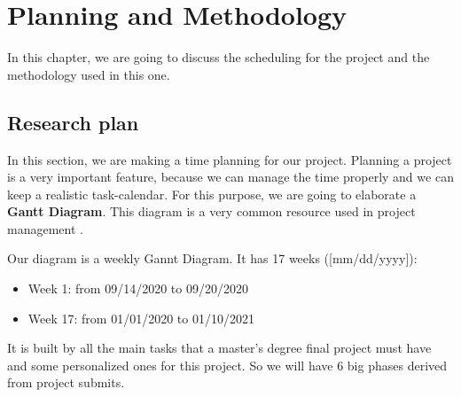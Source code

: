 \chapter{Planning and Methodology}
\label{chapter:planning}

In this chapter, we are going to discuss the scheduling for the project and the methodology used in this one.

\section{Research plan}
In this section, we are making a time planning for our project. Planning a project is a very important feature, because we can manage the time properly and we can keep a realistic task-calendar. For this purpose, we are going to elaborate a \textbf{Gantt Diagram}. This diagram is a very common resource used in project management \cite{tfm_cunha}.

Our diagram is a weekly Gannt Diagram. It has 17 weeks ([mm/dd/yyyy]): 

\begin{itemize}
    \item Week 1: from 09/14/2020 to 09/20/2020
    \item Week 17: from 01/01/2020 to 01/10/2021
\end{itemize}

It is built by all the main tasks that a master's degree final project must have and some personalized ones for this project. So we will have 6 big phases derived from project submits.


\clearpage

%


